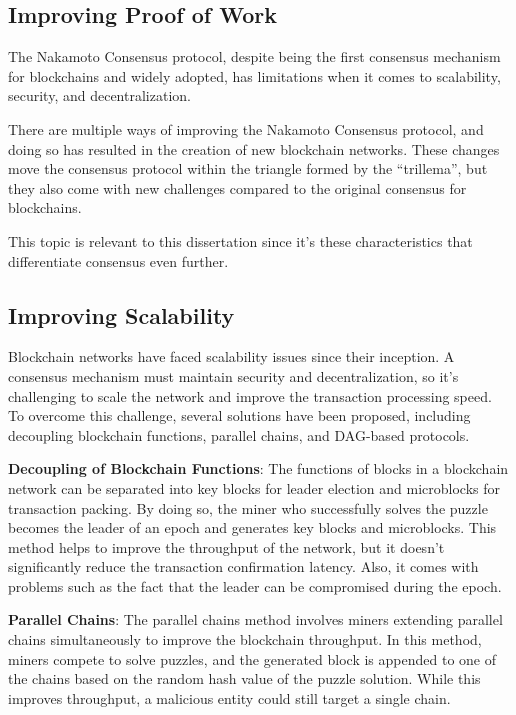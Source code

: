 \subsection*{Improving Proof of Work}

The Nakamoto Consensus protocol, despite being the first consensus mechanism for blockchains and widely adopted, has limitations when it comes to scalability, security, and decentralization.

There are multiple ways of improving the Nakamoto Consensus protocol, and doing so has resulted in the creation of new blockchain networks. These changes move the consensus protocol within the triangle formed by the ``trillema'', but they also come with new challenges compared to the original consensus for blockchains.

This topic is relevant to this dissertation since it's these characteristics that differentiate consensus even further.

\subsection*{Improving Scalability}
Blockchain networks have faced scalability issues since their inception. A consensus mechanism must maintain security and decentralization, so it's challenging to scale the network and improve the transaction processing speed. To overcome this challenge, several solutions have been proposed, including decoupling blockchain functions, parallel chains, and DAG-based protocols.

\textbf{Decoupling of Blockchain Functions}: The functions of blocks in a blockchain network can be separated into key blocks for leader election and microblocks for transaction packing. By doing so, the miner who successfully solves the puzzle becomes the leader of an epoch and generates key blocks and microblocks. This method helps to improve the throughput of the network, but it doesn't significantly reduce the transaction confirmation latency. Also, it comes with problems such as the fact that the leader can be compromised during the epoch.

\textbf{Parallel Chains}: The parallel chains method involves miners extending parallel chains simultaneously to improve the blockchain throughput. In this method, miners compete to solve puzzles, and the generated block is appended to one of the chains based on the random hash value of the puzzle solution. While this improves throughput, a malicious entity could still target a single chain.


